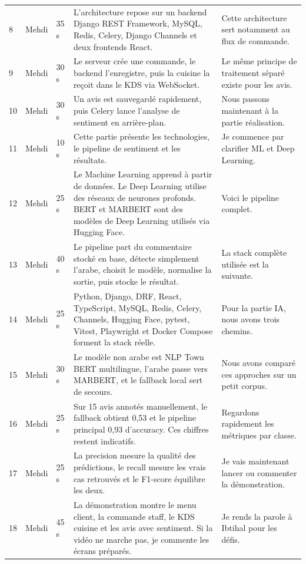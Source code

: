 \documentclass[11pt,a4paper]{article}
\begin{document}
\begin{longtable}{p{0.8cm}p{2cm}p{2cm}p{5.4cm}p{4.6cm}}
8 & Mehdi & 35 s & L'architecture repose sur un backend Django REST Framework, MySQL, Redis, Celery, Django Channels et deux frontends React. & Cette architecture sert notamment au flux de commande.\\
9 & Mehdi & 30 s & Le serveur crée une commande, le backend l'enregistre, puis la cuisine la reçoit dans le KDS via WebSocket. & Le même principe de traitement séparé existe pour les avis.\\
10 & Mehdi & 30 s & Un avis est sauvegardé rapidement, puis Celery lance l'analyse de sentiment en arrière-plan. & Nous passons maintenant à la partie réalisation.\\
11 & Mehdi & 10 s & Cette partie présente les technologies, le pipeline de sentiment et les résultats. & Je commence par clarifier ML et Deep Learning.\\
12 & Mehdi & 25 s & Le Machine Learning apprend à partir de données. Le Deep Learning utilise des réseaux de neurones profonds. BERT et MARBERT sont des modèles de Deep Learning utilisés via Hugging Face. & Voici le pipeline complet.\\
13 & Mehdi & 40 s & Le pipeline part du commentaire stocké en base, détecte simplement l'arabe, choisit le modèle, normalise la sortie, puis stocke le résultat. & La stack complète utilisée est la suivante.\\
14 & Mehdi & 25 s & Python, Django, DRF, React, TypeScript, MySQL, Redis, Celery, Channels, Hugging Face, pytest, Vitest, Playwright et Docker Compose forment la stack réelle. & Pour la partie IA, nous avons trois chemins.\\
15 & Mehdi & 30 s & Le modèle non arabe est NLP Town BERT multilingue, l'arabe passe vers MARBERT, et le fallback local sert de secours. & Nous avons comparé ces approches sur un petit corpus.\\
16 & Mehdi & 25 s & Sur 15 avis annotés manuellement, le fallback obtient 0,53 et le pipeline principal 0,93 d'accuracy. Ces chiffres restent indicatifs. & Regardons rapidement les métriques par classe.\\
17 & Mehdi & 25 s & La precision mesure la qualité des prédictions, le recall mesure les vrais cas retrouvés et le F1-score équilibre les deux. & Je vais maintenant lancer ou commenter la démonstration.\\
18 & Mehdi & 45 s & La démonstration montre le menu client, la commande staff, le KDS cuisine et les avis avec sentiment. Si la vidéo ne marche pas, je commente les écrans préparés. & Je rends la parole à Ibtihal pour les défis.\\

\end{longtable}
\end{document}
